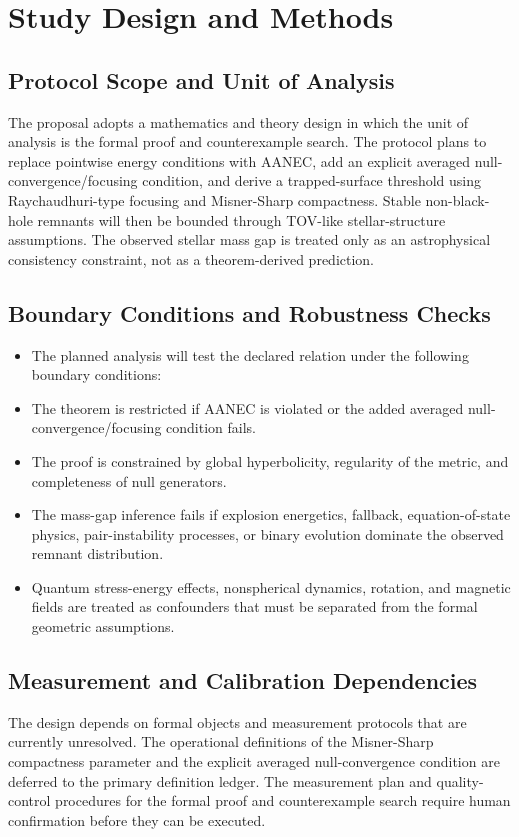 \documentclass[conference]{IEEEtran}
\begin{document}
\section{Study Design and Methods}
\subsection{Protocol Scope and Unit of Analysis}
The proposal adopts a mathematics and theory design in which the unit of analysis is the formal proof and counterexample search. The protocol plans to replace pointwise energy conditions with AANEC, add an explicit averaged null-convergence/focusing condition, and derive a trapped-surface threshold using Raychaudhuri-type focusing and Misner-Sharp compactness. Stable non-black-hole remnants will then be bounded through TOV-like stellar-structure assumptions. The observed stellar mass gap is treated only as an astrophysical consistency constraint, not as a theorem-derived prediction.

\subsection{Boundary Conditions and Robustness Checks}
\begin{itemize}
\item The planned analysis will test the declared relation under the following boundary conditions:
\item The theorem is restricted if AANEC is violated or the added averaged null-convergence/focusing condition fails.
\item The proof is constrained by global hyperbolicity, regularity of the metric, and completeness of null generators.
\item The mass-gap inference fails if explosion energetics, fallback, equation-of-state physics, pair-instability processes, or binary evolution dominate the observed remnant distribution.
\item Quantum stress-energy effects, nonspherical dynamics, rotation, and magnetic fields are treated as confounders that must be separated from the formal geometric assumptions.
\end{itemize}

\subsection{Measurement and Calibration Dependencies}
The design depends on formal objects and measurement protocols that are currently unresolved. The operational definitions of the Misner-Sharp compactness parameter and the explicit averaged null-convergence condition are deferred to the primary definition ledger. The measurement plan and quality-control procedures for the formal proof and counterexample search require human confirmation before they can be executed.
\end{document}
